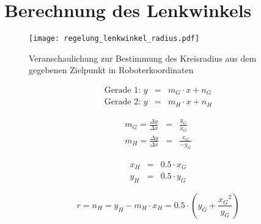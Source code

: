 \section{Berechnung des Lenkwinkels}

\begin{figure}[H] %
  \centering
  \texttt{[image: regelung\_lenkwinkel\_radius.pdf]}
  \caption{Veranschaulichung zur Bestimmung des Kreisradius aus dem gegebenen Zielpunkt in Roboterkoordinaten}
  \label{fig:regelung_lenkwinkel_radius}
\end{figure}

\begin{eqnarray}
\text{Gerade 1:  } y & = & m_G \cdot x + n_G 	\\
\text{Gerade 2:  } y & = & m_H \cdot x + n_H
\end{eqnarray}

\begin{eqnarray}
 m_G = \frac{\Delta y}{\Delta x} & = & \frac{y_G}{x_G} 	\\
 m_H = \frac{\Delta y}{\Delta x} & = & \frac{x_G}{-y_G}
\end{eqnarray}

\begin{eqnarray}
x_H & = & 0.5 \cdot x_G 	\\
y_H & = & 0.5 \cdot y_G
\end{eqnarray}

\begin{equation}
r = n_H = y_H - m_H \cdot x_H = 0.5 \cdot (y_G + \frac{{x_G}^2}{y_G} )
\end{equation}